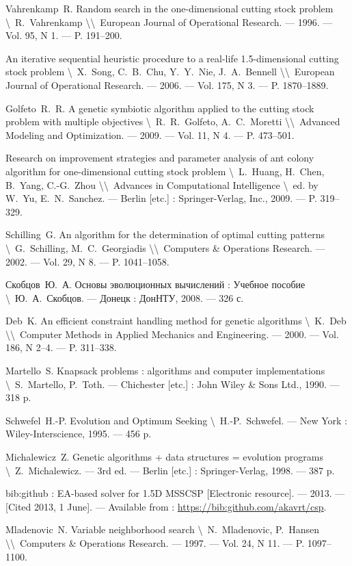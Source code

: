 \documentclass[12pt]{article}
\begin{document}
\begin{thebibliography}{00}
 Vahrenkamp~R. Random search in the one-dimensional 
cutting stock problem
\textbackslash~R.~Vahrenkamp 
\textbackslash\textbackslash~European Journal of Operational Research. 
--- 1996. --- Vol. 95, N 1. --- P. 191--200.

 An iterative sequential heuristic procedure to a 
real-life 1.5-dimensional cutting stock problem 
\textbackslash~X.~Song, C.~B.~Chu, Y.~Y.~Nie, J.~A.~Bennell 
\textbackslash\textbackslash~European Journal of Operational Research. 
--- 2006. --- Vol. 175, N 3. --- P. 1870--1889.

 Golfeto~R.~R. A genetic symbiotic algorithm applied 
to the cutting stock problem with multiple objectives 
\textbackslash~R.~R.~Golfeto, A.~C.~Moretti 
\textbackslash\textbackslash~Advanced Modeling and Optimization. 
--- 2009. --- Vol. 11, N 4. --- P. 473--501.

 Research on improvement strategies and parameter 
analysis of ant colony algorithm for one-dimensional cutting stock problem 
\textbackslash~L.~Huang, H.~Chen, B.~Yang, C.-G.~Zhou
\textbackslash\textbackslash~Advances in Computational Intelligence 
\textbackslash~ed. by W.~Yu, E.~N.~Sanchez. 
--- Berlin [etc.] : Springer-Verlag, Inc., 2009. --- P. 319--329.

 Schilling~G. An algorithm for the determination of 
optimal cutting patterns 
\textbackslash~G.~Schilling, M.~C.~Georgiadis 
\textbackslash\textbackslash~Computers \& Operations Research. 
--- 2002. --- Vol. 29, N 8. --- P. 1041--1058.

 Скобцов~Ю.~А. Основы эволюционных вычислений : 
Учебное пособие
\textbackslash~Ю.~А.~Скобцов.
--- Донецк : ДонНТУ, 2008. --- 326 с.

 Deb~K. An efficient constraint handling method for 
genetic algorithms 
\textbackslash~K.~Deb 
\textbackslash\textbackslash~Computer Methods in Applied Mechanics and Engineering. 
--- 2000. --- Vol. 186, N 2--4. --- P. 311--338.

 Martello~S. Knapsack problems : algorithms and 
computer implementations 
\textbackslash~S.~Martello, P.~Toth. 
--- Chichester [etc.] : John Wiley \& Sons Ltd., 1990. --- 318 p.

 Schwefel~H.-P. Evolution and Optimum Seeking 
\textbackslash~H.-P.~Schwefel. 
--- New York : Wiley-Interscience, 1995. --- 456 p.

 Michalewicz~Z. Genetic algorithms + data 
structures = evolution programs 
\textbackslash~Z.~Michalewicz. 
--- 3rd ed. --- Berlin [etc.] : Springer-Verlag, 1998. --- 387 p.

 bib:github : EA-based solver for 1.5D MSSCSP [Electronic 
resource]. 
--- 2013. --- [Cited 2013, 1 June]. 
--- Available from : \url{https://bib:github.com/akavrt/csp}.

 Mladenovic~N. Variable neighborhood search 
\textbackslash~N.~Mladenovic, P.~Hansen 
\textbackslash\textbackslash~Computers \& Operations Research. 
--- 1997. --- Vol. 24, N 11. --- P. 1097--1100.
\end{thebibliography}
\end{document}
